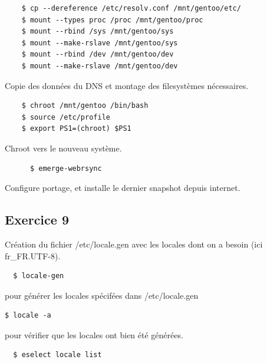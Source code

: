\documentclass{report}
\begin{document}
\begin{tcolorbox}
  \begin{verbatim}
    $ cp --dereference /etc/resolv.conf /mnt/gentoo/etc/
    $ mount --types proc /proc /mnt/gentoo/proc
    $ mount --rbind /sys /mnt/gentoo/sys
    $ mount --make-rslave /mnt/gentoo/sys
    $ mount --rbind /dev /mnt/gentoo/dev
    $ mount --make-rslave /mnt/gentoo/dev
  \end{verbatim}
\end{tcolorbox}
Copie des données du DNS et montage des filesystèmes nécessaires.

\begin{tcolorbox}
  \begin{verbatim}
    $ chroot /mnt/gentoo /bin/bash
    $ source /etc/profile
    $ export PS1=(chroot) $PS1
  \end{verbatim}
\end{tcolorbox}
Chroot vers le nouveau système.

\begin{tcolorbox}
  \begin{verbatim}
      $ emerge-webrsync
  \end{verbatim}
\end{tcolorbox}
Configure portage, et installe le dernier snapshot depuis internet.


\subsection{Exercice 9}
Création du fichier /etc/locale.gen avec les locales dont on a besoin (ici fr\_FR.UTF-8).
\begin{tcolorbox}
  \begin{verbatim}
  $ locale-gen
  \end{verbatim}
\end{tcolorbox}
pour générer les locales spécifées dans /etc/locale.gen

\begin{tcolorbox}
  \begin{verbatim}
$ locale -a
  \end{verbatim}
\end{tcolorbox}

pour vérifier que les locales ont bien été générées.

\begin{tcolorbox}
  \begin{verbatim}
  $ eselect locale list
  \end{verbatim}
\end{tcolorbox}
\end{document}
